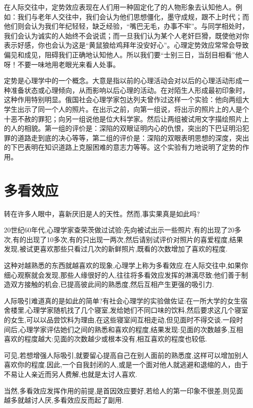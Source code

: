 \documentclass[11pt]{ctexart}
\begin{document}
在人际交往中，定势效应表现在人们用一种固定化了的人物形象去认知他人。例如：我们与老年人交往中，我们会认为他们思想僵化，墨守成规，跟不上时代；而他们则会认为我们年纪轻轻，缺乏经验，“嘴巴无毛，办事不牢”。与同学相处时，我们会认为诚实的人始终不会说谎；而一旦我们认为某个人老奸巨猾，既使他对你表示好感，你也会认为这是“黄鼠狼给鸡拜年没安好心”。心理定势效应常常会导致偏见和成见，阻碍我们正确地认知他人。所以我们要“士别三日，当刮目相看”他人呀！不要一味地用老眼光来看人处事。

定势是心理学中的一个概念。大意是指以前的心理活动会对以后的心理活动形成一种准备状态或心理倾向，从而影响以后心理的活动。在对陌生人形成最初印象时，这种作用特别明显。俄国社会心理学家包达列夫曾作过这样一个实验：他向两组大学生出示了同一个人的照片。在出示之前，向第一组说，将出示的照片上的人是个十恶不赦的罪犯；向另一组说他是位大科学家。然后让两组被试用文字描绘照片上的人的相貌。第一组的评价是：深陷的双眼证明内心的仇恨，突出的下巴证明沿犯罪的道路走到底的决心等等，第二组的评价是：深陷的双眼表明思想的深度，突出的下巴表明在知识道路上克服困难的意志力等等。这个实验有力地说明了定势的作用。
\section{多看效应}
\label{sec-33}


转在许多人眼中，喜新厌旧是人的天性。然而,事实果真是如此吗?

20世纪60年代,心理学家查荣茨做过试验:先向被试出示一些照片,有的出现了20多次,有的出现了10多次,有的只出现一两次,然后请别试评价对照片的喜爱程度,结果发现,被试更喜欢那些只看过几次的新鲜照片,既看的次数增加了喜欢的程度.

这种对越熟悉的东西就越喜欢的现象,心理学上称为多看效应.在人际交往中,如果你细心观察就会发现,那些人缘很好的人,往往将多看效应发挥的淋漓尽致:他们善于制造双方接触的机会,已提高彼此间的熟悉度,然后互相产生更强的吸引力.

人际吸引难道真的是如此的简单?有社会心理学的实验做佐证:在一所大学的女生宿舍楼里,心理学家随机找了几个寝室,发给她们不同口味的饮料,然后要求这几个寝室的女生,可以以品尝饮料为理由,在这些寝室间互相走动,但见面时不得交谈.一段时间后,心理学家评估她们之间的熟悉和喜欢的程度,结果发现:见面的次数越多,互相喜欢的程度越大:见面的次数越少或根本没有,相互喜欢的程度也较低.

可见,若想增强人际吸引,就要留心提高自己在别人面前的熟悉度,这样可以增加别人喜欢你的程度.因此,一个自我封闭的人,或是一个面对他人就逃避和退缩的人，由于不易让人亲近而另人费解,也就是太讨人喜欢.

当然,多看效应发挥作用的前提,是首因效应要好,若给人的第一印象不很差,则见面越多就越讨人厌,多看效应反而起了副用.
\end{document}
